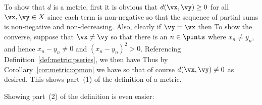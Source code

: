 {{    To show that $d$ is a metric, first it is obvious that $d(\vx, \vy) \geq 0$ for all $\vx, \vy \in X$ since each term is non-negative so that the sequence of partial sums is non-negative and non-decreasing.
    Also, clearly if $\vy = \vx$ then
    To show the converse, suppose that $\vx \neq \vy$ so that there is an $n \in \pints$ where $x_n \neq y_n$, and hence $x_n - y_n \neq 0$ and $(x_n - y_n)^2 > 0$.
    Referencing Definition~\ref{def:metric:pseries}, we then have
    Thus by Corollary~\ref{cor:metric:opmon} we have
    so that of course $d(\vx, \vy) \neq 0$ as desired.
    This shows part~(1) of the definition of a metric.

    Showing part~(2) of the definition is even easier:

}}
